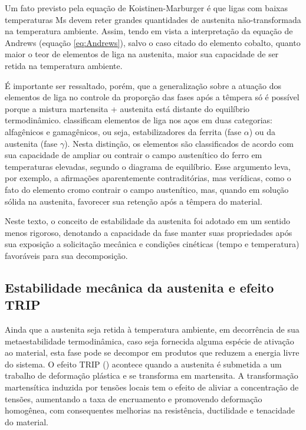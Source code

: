 Um fato previsto pela equação de Koistinen-Marburger é que ligas com baixas temperaturas Ms devem reter grandes quantidades de austenita não-transformada na temperatura ambiente. Assim, tendo em vista a interpretação da equação de Andrews (equação \ref{eq:Andrews}), salvo o caso citado do elemento cobalto, quanto maior o teor de elementos de liga na austenita, maior sua capacidade de ser retida na temperatura ambiente.

É importante ser ressaltado, porém, que a generalização sobre a atuação dos elementos de liga no controle da proporção das fases após a têmpera só é possível porque a mistura martensita + austenita está distante do equilíbrio termodinâmico. classificam elementos de liga nos aços em duas categorias: alfagênicos e gamagênicos, ou seja, estabilizadores da ferrita (fase $\alpha$) ou da austenita (fase $\gamma$). Nesta distinção, os elementos são classificados de acordo com sua capacidade de ampliar ou contrair o campo austenítico do ferro em temperaturas elevadas, segundo o diagrama de equilíbrio. Esse argumento leva, por exemplo, a afirmações aparentemente contraditórias, mas verídicas, como o fato do elemento cromo contrair o campo austenítico, mas, quando em solução sólida na austenita, favorecer sua retenção após a têmpera do material.

Neste texto, o conceito de estabilidade da austenita foi adotado em um sentido menos rigoroso, denotando a capacidade da fase manter suas propriedades após sua exposição a solicitação mecânica e condições cinéticas (tempo e temperatura) favoráveis para sua decomposição.


\subsection{Estabilidade mec\^{a}nica da austenita e efeito TRIP}

\label{subsec:TRIP}

Ainda que a austenita seja retida à temperatura ambiente, em decorrência de sua metaestabilidade termodinâmica, caso seja fornecida alguma espécie de ativação ao material, esta fase pode se decompor em produtos que reduzem a energia livre do sistema. O efeito TRIP () acontece quando a austenita é submetida a um trabalho de deformação plástica e se transforma em martensita. A transformação martensítica induzida por tensões locais tem o efeito de aliviar a concentração de tensões, aumentando a taxa de encruamento e promovendo deformação homogênea, com consequentes melhorias na resistência, ductilidade e tenacidade do material\cite{Honeycombe2006}.

